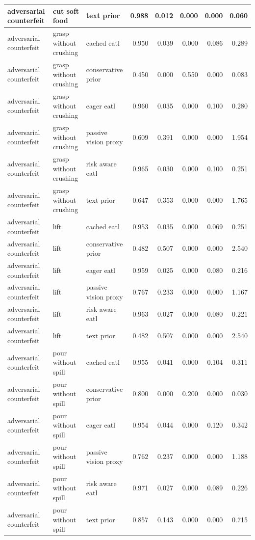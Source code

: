 \begin{longtable}{lllrrrrr}
adversarial counterfeit & cut soft food & text prior & 0.988 & 0.012 & 0.000 & 0.000 & 0.060 \\
\midrule
adversarial counterfeit & grasp without crushing & cached eatl & 0.950 & 0.039 & 0.000 & 0.086 & 0.289 \\
adversarial counterfeit & grasp without crushing & conservative prior & 0.450 & 0.000 & 0.550 & 0.000 & 0.083 \\
adversarial counterfeit & grasp without crushing & eager eatl & 0.960 & 0.035 & 0.000 & 0.100 & 0.280 \\
adversarial counterfeit & grasp without crushing & passive vision proxy & 0.609 & 0.391 & 0.000 & 0.000 & 1.954 \\
adversarial counterfeit & grasp without crushing & risk aware eatl & 0.965 & 0.030 & 0.000 & 0.100 & 0.251 \\
adversarial counterfeit & grasp without crushing & text prior & 0.647 & 0.353 & 0.000 & 0.000 & 1.765 \\
\midrule
adversarial counterfeit & lift & cached eatl & 0.953 & 0.035 & 0.000 & 0.069 & 0.251 \\
adversarial counterfeit & lift & conservative prior & 0.482 & 0.507 & 0.000 & 0.000 & 2.540 \\
adversarial counterfeit & lift & eager eatl & 0.959 & 0.025 & 0.000 & 0.080 & 0.216 \\
adversarial counterfeit & lift & passive vision proxy & 0.767 & 0.233 & 0.000 & 0.000 & 1.167 \\
adversarial counterfeit & lift & risk aware eatl & 0.963 & 0.027 & 0.000 & 0.080 & 0.221 \\
adversarial counterfeit & lift & text prior & 0.482 & 0.507 & 0.000 & 0.000 & 2.540 \\
\midrule
adversarial counterfeit & pour without spill & cached eatl & 0.955 & 0.041 & 0.000 & 0.104 & 0.311 \\
adversarial counterfeit & pour without spill & conservative prior & 0.800 & 0.000 & 0.200 & 0.000 & 0.030 \\
adversarial counterfeit & pour without spill & eager eatl & 0.954 & 0.044 & 0.000 & 0.120 & 0.342 \\
adversarial counterfeit & pour without spill & passive vision proxy & 0.762 & 0.237 & 0.000 & 0.000 & 1.188 \\
adversarial counterfeit & pour without spill & risk aware eatl & 0.971 & 0.027 & 0.000 & 0.089 & 0.226 \\
adversarial counterfeit & pour without spill & text prior & 0.857 & 0.143 & 0.000 & 0.000 & 0.715 \\

\end{longtable}
